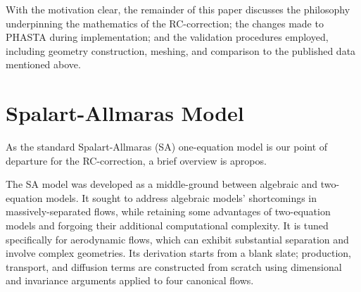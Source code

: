 \documentclass[11pt]{article}
\begin{document}
With the motivation clear, the remainder of this paper discusses the philosophy underpinning the mathematics of the RC-correction; the changes made to PHASTA during implementation; and the validation procedures employed, including geometry construction, meshing, and comparison to the published data mentioned above.

\section{Spalart-Allmaras Model} %

As the standard Spalart-Allmaras (SA) one-equation model \cite{spalart1992} is our point of departure for the RC-correction, a brief overview is apropos.

The SA model was developed as a middle-ground between algebraic and two-equation models. It sought to address algebraic models' shortcomings in massively-separated flows, while retaining some advantages of two-equation models and forgoing their additional computational complexity. It is tuned specifically for aerodynamic flows, which can exhibit substantial separation and involve complex geometries. Its derivation starts from a blank slate; production, transport, and diffusion terms are constructed from scratch using dimensional and invariance arguments applied to four canonical flows.
\end{document}
